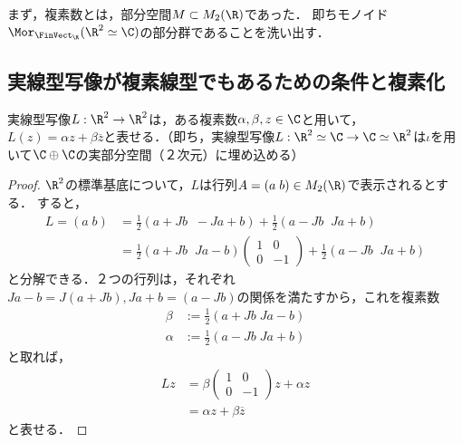 \documentclass[uplatex, dvipdfmx]{jsreport}
\begin{document}
まず，複素数とは，部分空間$M\subset M_2(\R)$であった．
即ちモノイド$\Mor_{\FinVect_\R}(\R^2\simeq\C)$の部分群であることを洗い出す．

\subsection{実線型写像が複素線型でもあるための条件と複素化}

\begin{proposition}[$\R^2$の実自己線型写像の複素数表示]\label{prop-linearity-between-real-complex}
    実線型写像$L:\R^2\to\R^2$は，ある複素数$\alpha,\beta,z\in\C$と用いて，
    $L(z)=\alpha z+\beta\overline{z}$と表せる．（即ち，実線型写像$L:\R^2\simeq\C\to\C\simeq\R^2$は$\iota$を用いて$\C\oplus\C$の実部分空間（２次元）に埋め込める）
\end{proposition}
\begin{proof}
    $\R^2$の標準基底について，$L$は行列$A=(a\;b)\in M_2(\R)$で表示されるとする．
    すると，
    \begin{align*}
        L=(a\;b) &=\frac{1}{2}(a+Jb\;\;-Ja+b)+\frac{1}{2}(a-Jb\;\;Ja+b)\\
        &=\frac{1}{2}(a+Jb\;\;Ja-b)\begin{pmatrix}1&0\\0&-1\end{pmatrix}+\frac{1}{2}(a-Jb\;\;Ja+b)
    \end{align*}
    と分解できる．２つの行列は，それぞれ$Ja-b=J(a+Jb), Ja+b=(a-Jb)$の関係を満たすから，これを複素数
    \begin{align*}
        \beta&:=\frac{1}{2}(a+Jb\;Ja-b)\\
        \alpha&:=\frac{1}{2}(a-Jb\;Ja+b)
    \end{align*}
    と取れば，
    \begin{align*}
        Lz &= \beta\begin{pmatrix}1&0\\0&-1\end{pmatrix}z + \alpha z\\
        &= \alpha z+\beta\overline{z}
    \end{align*}
    と表せる．
\end{proof}
\end{document}
